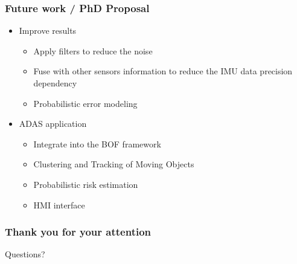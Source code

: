 \documentclass{beamer}
\begin{document}
	\begin{frame}
		\frametitle{Future work / PhD Proposal}

			\begin{itemize}
			\item Improve results 
			
				\begin{itemize}
				\item Apply filters to reduce the noise
				\item Fuse with other sensors information to reduce the IMU data precision dependency
				\item Probabilistic error modeling
				\end{itemize}			
				
			\item ADAS application
			
				\begin{itemize}
				\item Integrate into the BOF framework
				\item Clustering and Tracking of Moving Objects
				\item Probabilistic risk estimation
				\item HMI interface
				\end{itemize}

			\end{itemize}
		
	\end{frame}

	\begin{frame}
		\frametitle{Thank you for your attention}	
	
	\begin{alertblock}{}
		\centering
		Questions?
	\end{alertblock}
	\end{frame} 	
 
 	
{} 	
\end{document}
